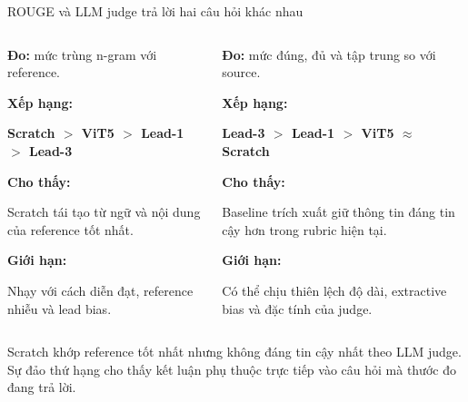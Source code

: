 \documentclass[aspectratio=169,10pt]{beamer}
\begin{document}
\begin{frame}{ROUGE và LLM judge trả lời hai câu hỏi khác nhau}
  \begin{columns}[T,onlytextwidth]
      \begin{tcolorbox}[
        title=ROUGE trên 2.000 mẫu,
        colback=SoftGreen,colframe=GoodGreen,
        colbacktitle=GoodGreen,coltitle=white,
        fonttitle=\bfseries]
        \footnotesize
        \textbf{Đo:} mức trùng n-gram với reference.

        \vspace{0.7mm}
        \textbf{Xếp hạng:}\par
        \textbf{Scratch $>$ ViT5 $>$ Lead-1 $>$ Lead-3}

        \vspace{0.7mm}
        \textbf{Cho thấy:}\par
        Scratch tái tạo từ ngữ và nội dung của reference tốt nhất.

        \vspace{0.7mm}
        \textbf{Giới hạn:}\par
        Nhạy với cách diễn đạt, reference nhiễu và lead bias.
      \end{tcolorbox}

      \begin{tcolorbox}[
        title=LLM judge trên 200 mẫu,
        colback=SoftBlue,colframe=MidBlue,
        colbacktitle=MidBlue,coltitle=white,
        fonttitle=\bfseries]
        \footnotesize
        \textbf{Đo:} mức đúng, đủ và tập trung so với source.

        \vspace{0.7mm}
        \textbf{Xếp hạng:}\par
        \textbf{Lead-3 $>$ Lead-1 $>$ ViT5 $\approx$ Scratch}

        \vspace{0.7mm}
        \textbf{Cho thấy:}\par
        Baseline trích xuất giữ thông tin đáng tin cậy hơn trong rubric hiện tại.

        \vspace{0.7mm}
        \textbf{Giới hạn:}\par
        Có thể chịu thiên lệch độ dài, extractive bias và đặc tính của judge.
      \end{tcolorbox}
  \end{columns}

  \vspace{0.8mm}
  \begin{keymessage}
    \scriptsize Scratch khớp reference tốt nhất nhưng không đáng tin cậy nhất theo LLM judge. Sự đảo thứ hạng cho thấy kết luận phụ thuộc trực tiếp vào câu hỏi mà thước đo đang trả lời.
  \end{keymessage}
\end{frame}
\end{document}
